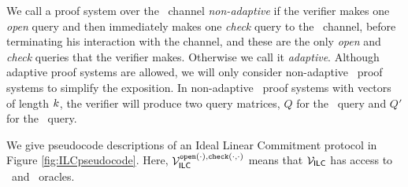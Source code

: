 We call a proof system over the \ILC\ channel \emph{non-adaptive} if the verifier makes one \emph{open} query and then immediately makes one \emph{check} query to the \ILC\ channel, before terminating his interaction with the channel, and these are the only \emph{open} and \emph{check} queries that the verifier makes. Otherwise we call it \emph{adaptive}. Although adaptive proof systems are allowed, we will only consider non-adaptive \ILC\ proof systems to simplify the exposition. In non-adaptive \ILC\ proof systems with vectors of length $k$, the verifier will produce two query matrices, $Q$ for the \ILCopen\ query and $Q'$ for the \ILCcheck\ query. 


We give pseudocode descriptions of an Ideal Linear Commitment protocol in Figure \ref{fig:ILCpseudocode}. Here, $\mathcal{V}_{\mathsf{ILC}}^{\texttt{open}(\cdot),\texttt{check}(\cdot,\cdot)}$ means that $\mathcal{V}_{\mathsf{ILC}}$ has access to \ILCopen\ and \ILCcheck\ oracles.

